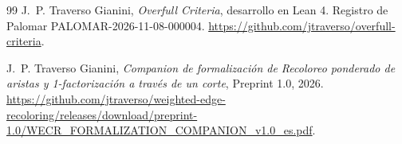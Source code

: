 \documentclass[11pt]{article}
\begin{document}
\begin{thebibliography}{99}
J.~P. Traverso Gianini, \emph{Overfull Criteria}, desarrollo en Lean 4.
Registro de Palomar PALOMAR-2026-11-08-000004.
\url{https://github.com/jtraverso/overfull-criteria}.

J.~P. Traverso Gianini,
\emph{Companion de formalización de Recoloreo ponderado de aristas y 1-factorización a través de un corte}, Preprint 1.0, 2026.
\url{https://github.com/jtraverso/weighted-edge-recoloring/releases/download/preprint-1.0/WECR_FORMALIZATION_COMPANION_v1.0_es.pdf}.

\end{thebibliography}
\end{document}
